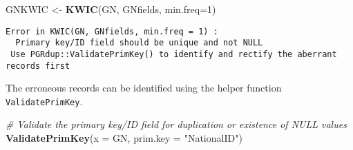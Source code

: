 \documentclass[]{article}
\newenvironment{Shaded}{\begin{snugshade}}{\end{snugshade}}
\newcommand{\CommentTok}[1]{\textcolor[rgb]{0.56,0.35,0.01}{\textit{#1}}}
\newcommand{\DataTypeTok}[1]{\textcolor[rgb]{0.13,0.29,0.53}{#1}}
\newcommand{\DecValTok}[1]{\textcolor[rgb]{0.00,0.00,0.81}{#1}}
\newcommand{\KeywordTok}[1]{\textcolor[rgb]{0.13,0.29,0.53}{\textbf{#1}}}
\newcommand{\NormalTok}[1]{#1}
\newcommand{\StringTok}[1]{\textcolor[rgb]{0.31,0.60,0.02}{#1}}
\begin{document}
\begin{Shaded}
\begin{Highlighting}[]
\NormalTok{GNKWIC <-}\StringTok{ }\KeywordTok{KWIC}\NormalTok{(GN, GNfields, }\DataTypeTok{min.freq=}\DecValTok{1}\NormalTok{)}
\end{Highlighting}
\end{Shaded}

\begin{verbatim}
Error in KWIC(GN, GNfields, min.freq = 1) :
  Primary key/ID field should be unique and not NULL
 Use PGRdup::ValidatePrimKey() to identify and rectify the aberrant records first
\end{verbatim}

The erroneous records can be identified using the helper function
\texttt{ValidatePrimKey}.

\begin{Shaded}
\begin{Highlighting}[]
\CommentTok{# Validate the primary key/ID field for duplication or existence of NULL values}
\KeywordTok{ValidatePrimKey}\NormalTok{(}\DataTypeTok{x =}\NormalTok{ GN, }\DataTypeTok{prim.key =} \StringTok{"NationalID"}\NormalTok{)}
\end{Highlighting}
\end{Shaded}
\end{document}
